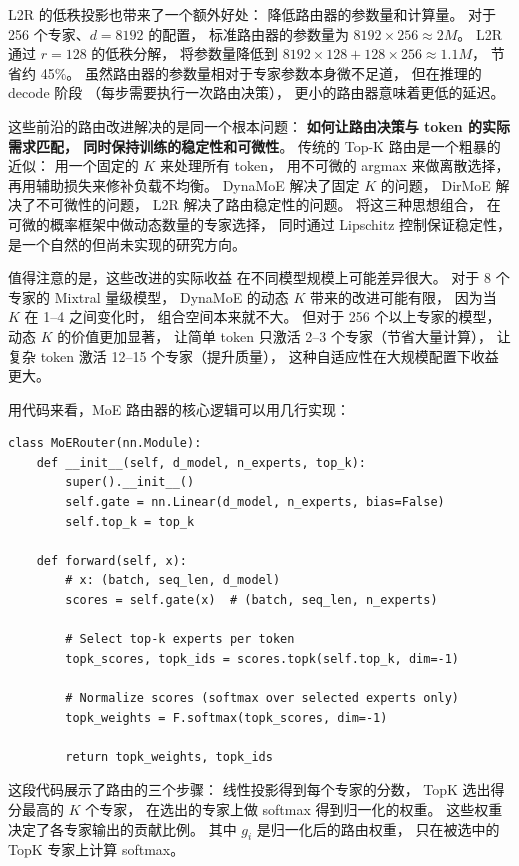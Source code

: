 L2R 的低秩投影也带来了一个额外好处：
降低路由器的参数量和计算量。
对于 256 个专家、$d = 8192$ 的配置，
标准路由器的参数量为 $8192 \times 256 \approx 2M$。
L2R 通过 $r = 128$ 的低秩分解，
将参数量降低到 $8192 \times 128 + 128 \times 256 \approx 1.1M$，
节省约 45\%。
虽然路由器的参数量相对于专家参数本身微不足道，
但在推理的 decode 阶段
（每步需要执行一次路由决策），
更小的路由器意味着更低的延迟。

这些前沿的路由改进解决的是同一个根本问题：
\textbf{如何让路由决策与 token 的实际需求匹配，
同时保持训练的稳定性和可微性}。
传统的 Top-K 路由是一个粗暴的近似：
用一个固定的 $K$ 来处理所有 token，
用不可微的 argmax 来做离散选择，
再用辅助损失来修补负载不均衡。
DynaMoE 解决了固定 $K$ 的问题，
DirMoE 解决了不可微性的问题，
L2R 解决了路由稳定性的问题。
将这三种思想组合，
在可微的概率框架中做动态数量的专家选择，
同时通过 Lipschitz 控制保证稳定性，
是一个自然的但尚未实现的研究方向。

值得注意的是，这些改进的实际收益
在不同模型规模上可能差异很大。
对于 8 个专家的 Mixtral 量级模型，
DynaMoE 的动态 $K$ 带来的改进可能有限，
因为当 $K$ 在 1--4 之间变化时，
组合空间本来就不大。
但对于 256 个以上专家的模型，
动态 $K$ 的价值更加显著，
让简单 token 只激活 2--3 个专家（节省大量计算），
让复杂 token 激活 12--15 个专家（提升质量），
这种自适应性在大规模配置下收益更大。

用代码来看，MoE 路由器的核心逻辑可以用几行实现：

\begin{lstlisting}[caption={MoE router implementation}]
class MoERouter(nn.Module):
    def __init__(self, d_model, n_experts, top_k):
        super().__init__()
        self.gate = nn.Linear(d_model, n_experts, bias=False)
        self.top_k = top_k

    def forward(self, x):
        # x: (batch, seq_len, d_model)
        scores = self.gate(x)  # (batch, seq_len, n_experts)

        # Select top-k experts per token
        topk_scores, topk_ids = scores.topk(self.top_k, dim=-1)

        # Normalize scores (softmax over selected experts only)
        topk_weights = F.softmax(topk_scores, dim=-1)

        return topk_weights, topk_ids
\end{lstlisting}

这段代码展示了路由的三个步骤：
线性投影得到每个专家的分数，
TopK 选出得分最高的 $K$ 个专家，
在选出的专家上做 softmax 得到归一化的权重。
这些权重决定了各专家输出的贡献比例。
其中 $g_i$ 是归一化后的路由权重，
只在被选中的 TopK 专家上计算 softmax。

